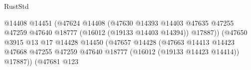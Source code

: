 \begin{lexlean}{RustStd}
\begin{coremodule}
                                                                @14408
                                                                @14451
                                                                (@47624
                                                                  @14408
                                                                  (@47630
                                                                    @14393
                                                                    @14403
                                                                    @47635
                                                                    @47255
                                                                    @47259
                                                                    @47640
                                                                    @18777
                                                                    (@16012 (@19133 @14403 @14394))
                                                                    @17887))
                                                                (@47650
                                                                  @3915
                                                                  @13
                                                                  @17
                                                                  @14428
                                                                  @14450
                                                                  (@47657
                                                                    @14428
                                                                    (@47663
                                                                      @14413
                                                                      @14423
                                                                      @47668
                                                                      @47255
                                                                      @47259
                                                                      @47640
                                                                      @18777
                                                                      (@16012
                                                                        (@19133 @14423 @14414))
                                                                      @17887))
                                                                  (@47681
                                                                    @123

\end{coremodule}
\end{lexlean}
